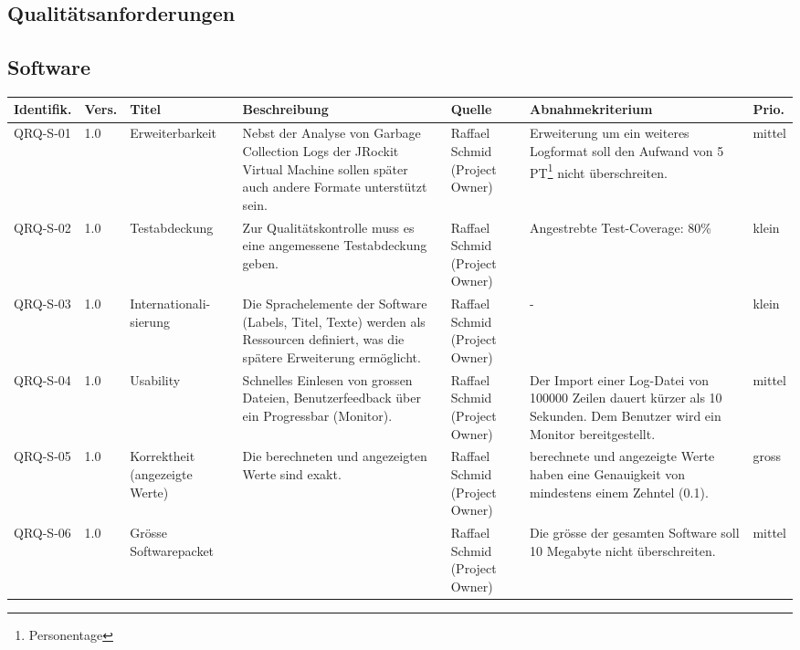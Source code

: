 \begin{landscape}
\section{Qualitätsanforderungen}
\subsection{Software}
\begin{longtable}{|p{1.6cm}|p{0.7cm}|p{2.5cm}|p{4.5cm}|p{2.6cm}|p{4cm}|p{0.9cm}|}
    \hline
    \textbf{Identifik.} & \textbf{Vers.}& \textbf{Titel} & \textbf{Beschreibung} & \textbf{Quelle} & \textbf{Abnahmekriterium} & \textbf{Prio.}\\\hline
   QRQ-S-01 & 1.0 & Erweiterbarkeit & Nebst der Analyse von Garbage Collection Logs der JRockit Virtual Machine sollen später auch andere Formate unterstützt sein. & Raffael Schmid (Project Owner) & Erweiterung um ein weiteres Logformat soll den Aufwand von 5 PT\footnote{Personentage} nicht überschreiten. & mittel \\\hline
   QRQ-S-02 & 1.0 & Testabdeckung & Zur Qualitätskontrolle muss es eine angemessene Testabdeckung geben. & Raffael Schmid (Project Owner) & Angestrebte Test-Coverage: 80\% & klein \\\hline
  QRQ-S-03 & 1.0 & Internationali-sierung & Die Sprachelemente der Software (Labels, Titel, Texte) werden als Ressourcen definiert, was die spätere Erweiterung ermöglicht. & Raffael Schmid (Project Owner) & - & klein\\\hline

   QRQ-S-04 & 1.0 & Usability & Schnelles Einlesen von grossen Dateien, Benutzerfeedback über ein Progressbar (Monitor). & Raffael Schmid (Project Owner) & Der Import einer Log-Datei von 100000 Zeilen dauert kürzer als 10 Sekunden. Dem Benutzer wird ein Monitor bereitgestellt.&mittel \\\hline

  QRQ-S-05 & 1.0 & Korrektheit (angezeigte Werte) & Die berechneten und angezeigten Werte sind exakt. & Raffael Schmid (Project Owner) & berechnete und angezeigte Werte haben eine Genauigkeit von mindestens einem Zehntel (0.1). & gross\\\hline
  
QRQ-S-06 & 1.0 & Grösse Softwarepacket & & Raffael Schmid (Project Owner) & Die grösse der gesamten Software soll 10 Megabyte nicht überschreiten. & mittel\\\hline


\end{longtable}
\end{landscape}
